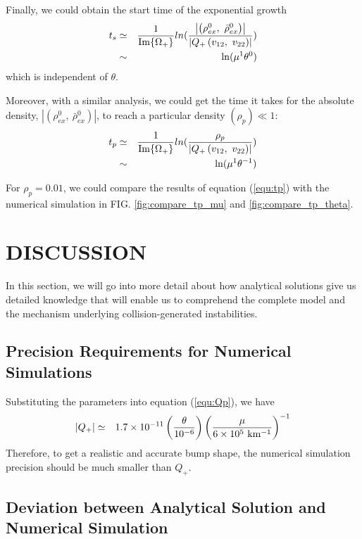 \documentclass[aps,prd,twocolumn,amsmath,amssymb,groupedaddress]{revtex4-2}
\begin{document}
Finally, we could obtain the start time of the exponential growth
\begin{eqnarray}
	t_s	&\simeq& 
	\frac{1}{\rm{Im}\{\Omega_+\}}ln(\frac{\left| \left(\rho^0_{ex}, ~\bar{\rho}^0_{ex}\right) \right|}{\left|Q_+\left(v_{12}, ~ v_{22}\right)\right|})	\nonumber \\
	&\sim& \ln(\mu^1 \theta^0)
\end{eqnarray}
which is independent of $\theta$.

Moreover, with a similar analysis, we could get the time it takes for the absolute density, $\left| \left(\rho^0_{ex}, ~\bar{\rho}^0_{ex}\right) \right|$, to reach a particular density $(\rho_{p}) \ll 1$:
\begin{eqnarray}
	\label{equ:tp}
	t_{p}	&\simeq& 
	\frac{1}{\rm{Im}\{\Omega_+\}}ln(\frac{\rho_{p}}{\left|Q_+\left(v_{12}, ~ v_{22}\right)\right|})	\nonumber \\
	&\sim& \ln(\mu^1 \theta^{-1})
\end{eqnarray}

For $\rho_p = 0.01$, we could compare the results of equation (\ref{equ:tp}) with the numerical simulation in FIG. \ref{fig:compare_tp_mu} and \ref{fig:compare_tp_theta}.

\section{\label{sec:disscussion} DISCUSSION}
In this section, we will go into more detail about how analytical solutions give us detailed knowledge that will enable us to comprehend the complete model and the mechanism underlying collision-generated instabilities.

\subsection{\label{subsec:precision_of_num}Precision Requirements for Numerical Simulations}
Substituting the parameters into equation (\ref{equ:Qp}), we have 
\begin{eqnarray}
	\label{equ:Qp_num}
	\left|Q_+\right|
	&\simeq&
	1.7 \times 10^{-11} \left(\frac{\theta}{10^{-6}}\right) \left(\frac{\mu}{6 \times 10^5 \rm{~km^{-1}}}\right)^{-1}
\end{eqnarray}
Therefore, to get a realistic and accurate bump shape, the numerical simulation precision should be much smaller than $Q_+$. 

\subsection{\label{subsec:deviation} Deviation between Analytical Solution and Numerical Simulation}
\end{document}
